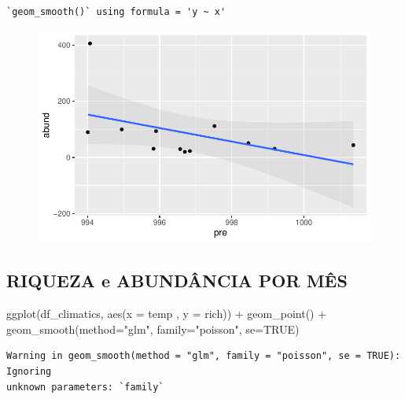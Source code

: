 \documentclass[
  letterpaper,
  DIV=11,
  numbers=noendperiod]{scrartcl}
\newenvironment{Shaded}{\begin{snugshade}}{\end{snugshade}}
\newcommand{\AttributeTok}[1]{\textcolor[rgb]{0.40,0.45,0.13}{#1}}
\newcommand{\ConstantTok}[1]{\textcolor[rgb]{0.56,0.35,0.01}{#1}}
\newcommand{\FunctionTok}[1]{\textcolor[rgb]{0.28,0.35,0.67}{#1}}
\newcommand{\NormalTok}[1]{\textcolor[rgb]{0.00,0.23,0.31}{#1}}
\newcommand{\SpecialCharTok}[1]{\textcolor[rgb]{0.37,0.37,0.37}{#1}}
\newcommand{\StringTok}[1]{\textcolor[rgb]{0.13,0.47,0.30}{#1}}
\begin{document}
\begin{verbatim}
`geom_smooth()` using formula = 'y ~ x'
\end{verbatim}

\begin{figure}[H]

{\centering \includegraphics{report_nmds_files/figure-pdf/unnamed-chunk-10-1.pdf}

}

\end{figure}

\hypertarget{riqueza-e-abunduxe2ncia-por-muxeas}{%
\subsection{RIQUEZA e ABUNDÂNCIA POR
MÊS}\label{riqueza-e-abunduxe2ncia-por-muxeas}}

\begin{Shaded}
\begin{Highlighting}[]
\FunctionTok{ggplot}\NormalTok{(df\_climatics, }\FunctionTok{aes}\NormalTok{(}\AttributeTok{x =}\NormalTok{ temp , }\AttributeTok{y =}\NormalTok{ rich)) }\SpecialCharTok{+}
  \FunctionTok{geom\_point}\NormalTok{() }\SpecialCharTok{+}
  \FunctionTok{geom\_smooth}\NormalTok{(}\AttributeTok{method=}\StringTok{"glm"}\NormalTok{, }\AttributeTok{family=}\StringTok{"poisson"}\NormalTok{, }\AttributeTok{se=}\ConstantTok{TRUE}\NormalTok{)}
\end{Highlighting}
\end{Shaded}

\begin{verbatim}
Warning in geom_smooth(method = "glm", family = "poisson", se = TRUE): Ignoring
unknown parameters: `family`
\end{verbatim}
\end{document}
